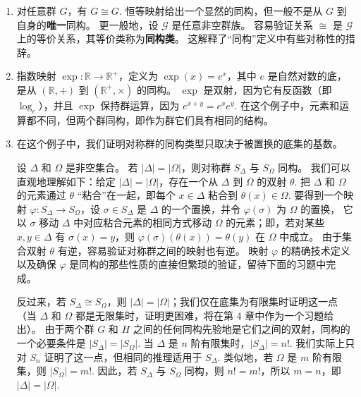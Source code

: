 \begin{example}
\begin{enumerate}[label=(\arabic*)]
\item 对任意群 \( G \)，有 \( G \cong G \). 
恒等映射给出一个显然的同构，但一般不是从 \( G \) 到自身的\textbf{唯一}同构。
更一般地，设 \( \mathcal{G} \) 是任意非空群族。
容易验证关系 \( \cong \) 是 \( \mathcal{G} \) 上的等价关系，其等价类称为\textbf{同构类}。
这解释了“同构”定义中有些对称性的措辞。

\item 指数映射 \( \exp : \mathbb{R} \to \mathbb{R}^+ \)，定义为 \( \exp(x) = e^x \)，其中 \( e \) 是自然对数的底，是从 \( (\mathbb{R}, +) \) 到 \( (\mathbb{R}^+, \times) \) 的同构。
\( \exp \) 是双射，因为它有反函数（即 \( \log_e \)），并且 \( \exp \) 保持群运算，因为 \( e^{x+y} = e^x e^y \). 
在这个例子中，元素和运算都不同，但两个群同构，即作为群它们具有相同的结构。

\item 在这个例子中，我们证明对称群的同构类型只取决于被置换的底集的基数。

设 \( \Delta \) 和 \( \Omega \) 是非空集合。
若 \( |\Delta| = |\Omega| \)，则对称群 \( S_\Delta \) 与 \( S_\Omega \) 同构。
我们可以直观地理解如下：给定 \( |\Delta| = |\Omega| \)，存在一个从 \( \Delta \) 到 \( \Omega \) 的双射 \( \theta \).
把 \( \Delta \) 和 \( \Omega \) 的元素通过 \( \theta \) “粘合”在一起，即每个 \( x \in \Delta \) 粘合到 \( \theta(x) \in \Omega \). 
要得到一个映射 \( \varphi : S_\Delta \to S_\Omega \)，设 \( \sigma \in S_\Delta \) 是 \( \Delta \) 的一个置换，并令 \( \varphi(\sigma) \) 为 \( \Omega \) 的置换，
它以 \( \sigma \) 移动 \( \Delta \) 中对应粘合元素的相同方式移动 \( \Omega \) 的元素；即，若对某些 \( x, y \in \Delta \) 有 \( \sigma(x) = y \)，则 \( \varphi(\sigma)(\theta(x)) = \theta(y) \) 在 \( \Omega \) 中成立。
由于集合双射 \( \theta \) 有逆，容易验证对称群之间的映射也有逆。
映射 \( \varphi \) 的精确技术定义以及确保 \( \varphi \) 是同构的那些性质的直接但繁琐的验证，留待下面的习题中完成。

反过来，若 \( S_\Delta \cong S_\Omega \)，则 \( |\Delta| = |\Omega| \)；我们仅在底集为有限集时证明这一点（当 \( \Delta \) 和 \( \Omega \) 都是无限集时，证明更困难，将在第 4 章中作为一个习题给出）。
由于两个群 \( G \) 和 \( H \) 之间的任何同构先验地是它们之间的双射，同构的一个必要条件是 \( |S_\Delta| = |S_\Omega| \). 
当 \( \Delta \) 是 \( n \) 阶有限集时，\( |S_\Delta| = n! \). 
我们实际上只对 \( S_n \) 证明了这一点，但相同的推理适用于 \( S_\Delta \). 
类似地，若 \( \Omega \) 是 \( m \) 阶有限集，则 \( |S_\Omega| = m! \). 
因此，若 \( S_\Delta \) 与 \( S_\Omega \) 同构，则 \( n! = m! \)，所以 \( m = n \)，即 \( |\Delta| = |\Omega| \).
\end{enumerate}
\end{example}

